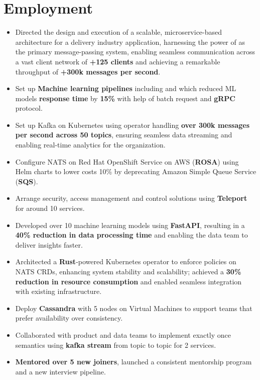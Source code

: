 \section{Employment}

\begin{itemize}
      \item Directed the design and execution of a scalable, microservice-based architecture for a delivery industry application, harnessing the power of  as the primary message-passing system, enabling seamless communication across a vast client network of \textbf{+125 clients} and achieving a remarkable throughput of \textbf{+300k messages per second}.
      \item Set up \textbf{Machine learning pipelines} including  and
             which reduced ML models \textbf{response time} by \textbf{15\%}
            with help of batch request and \textbf{gRPC} protocol.
      \item Set up Kafka on Kubernetes using  operator handling \textbf{over 300k messages per second across 50 topics}, ensuring seamless data streaming and enabling real-time analytics for the organization.
      \item Configure NATS on Red Hat OpenShift Service on AWS (\textbf{ROSA})
            using Helm charts to lower costs 10\% by deprecating Amazon Simple Queue Service (\textbf{SQS}).
      \item Arrange security, access management and control solutions using \textbf{Teleport} for around 10 services.
      \item Developed over 10 machine learning models using \textbf{FastAPI}, resulting in a \textbf{40\% reduction in data processing time} and enabling the data team to deliver insights faster.
      \item Architected a \textbf{Rust}-powered Kubernetes operator to enforce policies on NATS CRDs, enhancing system stability and scalability; achieved a \textbf{30\% reduction in resource consumption} and enabled seamless integration with existing infrastructure.
      \item Deploy \textbf{Cassandra} with 5 nodes on Virtual Machines to support teams that prefer availability over consistency.
      \item Collaborated with product and data teams to implement exactly once semantics using \textbf{kafka stream} from topic to topic for 2 services.
      \item \textbf{Mentored over 5 new joiners}, launched a consistent mentorship program and a new interview pipeline.
\end{itemize}

